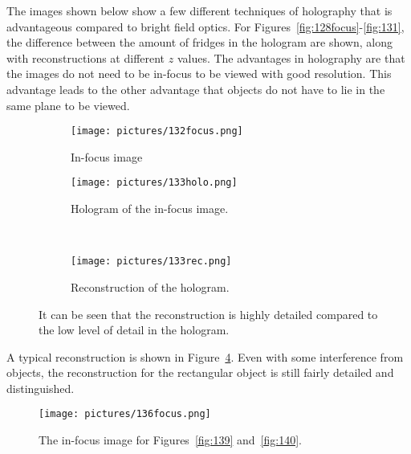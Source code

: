 The images shown below show a few different
techniques of holography that is advantageous compared to bright field optics.
For Figures~\ref{fig:128focus}-\ref{fig:131}, the difference between the amount of fridges in the hologram
are shown, along with reconstructions at different $z$ values. The advantages
in holography are that the images do not need to be in-focus to be viewed with
good resolution. This advantage leads to the other advantage that objects do
not have to lie in the same plane to be viewed.

\begin{figure}[ht!]
    \begin{center}

        \begin{subfigure}[t]{0.4\textwidth}
            \label{fig:132focus}
            \texttt{[image: pictures/132focus.png]}
            \caption{In-focus image}
        \end{subfigure}
        \begin{subfigure}[t]{0.4\textwidth}
            \label{fig:133holo}
            \texttt{[image: pictures/133holo.png]}
            \caption{Hologram of the in-focus image.}
        \end{subfigure}
        \\
        \begin{subfigure}[t]{\textwidth}
            \label{fig:133rec}
            \texttt{[image: pictures/133rec.png]}
            \caption{Reconstruction of the hologram.}
        \end{subfigure}


    \end{center}
    \caption{%
       It can be seen that the reconstruction is highly detailed compared to
       the low level of detail in the hologram.
    }%
    \label{fig:133}
\end{figure}

A typical reconstruction is shown in Figure~\ref{fig:133}. Even with some
interference from objects, the reconstruction for the rectangular object is
still fairly detailed and distinguished.


\begin{figure}
\begin{center}
    \texttt{[image: pictures/136focus.png]}
    \caption{The in-focus image for Figures~\ref{fig:139} and~\ref{fig:140}. }
    \label{fig:136focus}
\end{center}
\end{figure}


